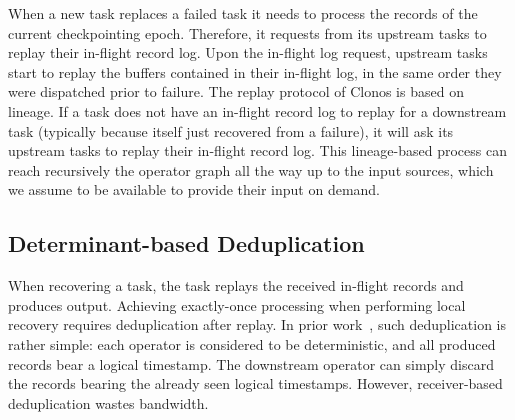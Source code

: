 \documentclass[sigconf]{acmart}
\begin{document}
When a new task replaces a failed task it needs to process the records of the current checkpointing epoch.
Therefore, it requests from its upstream tasks to replay their in-flight record log.
Upon the in-flight log request, upstream tasks start to replay the buffers contained in their in-flight log, in the same order they were dispatched prior to failure. The replay protocol of Clonos is based on lineage.
If a task does not have an in-flight record log to replay for a downstream task (typically because itself just recovered from a failure), it will ask its upstream tasks to replay their in-flight record log.
This lineage-based process can reach recursively the operator graph all the way up to the input sources, which we assume to be available to provide their input on demand.








\subsection{Determinant-based Deduplication}
When recovering a task, the task replays the received in-flight records and produces output. Achieving exactly-once processing when performing local recovery requires deduplication after replay. In prior work~\cite{FernandezMK13}, such deduplication is rather simple: each operator is considered to be deterministic, and all produced records bear a logical timestamp. The downstream operator can simply discard the records bearing the already seen logical timestamps. However, receiver-based deduplication wastes bandwidth. 
\end{document}
